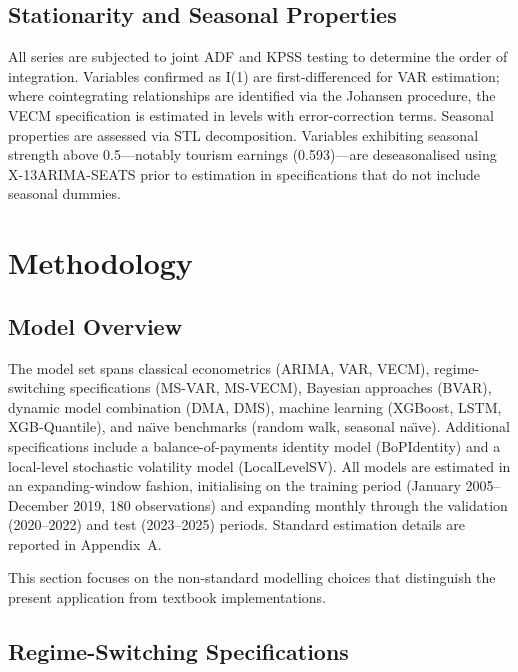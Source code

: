 \documentclass[12pt,a4paper]{article}
\begin{document}
\subsection{Stationarity and Seasonal Properties}

All series are subjected to joint ADF and KPSS testing to determine the order of integration. Variables confirmed as I(1) are first-differenced for VAR estimation; where cointegrating relationships are identified via the Johansen procedure, the VECM specification is estimated in levels with error-correction terms. Seasonal properties are assessed via STL decomposition. Variables exhibiting seasonal strength above 0.5---notably tourism earnings (0.593)---are deseasonalised using X-13ARIMA-SEATS prior to estimation in specifications that do not include seasonal dummies.

\section{Methodology}

\subsection{Model Overview}

The model set spans classical econometrics (ARIMA, VAR, VECM), regime-switching specifications (MS-VAR, MS-VECM), Bayesian approaches (BVAR), dynamic model combination (DMA, DMS), machine learning (XGBoost, LSTM, XGB-Quantile), and na\"{\i}ve benchmarks (random walk, seasonal na\"{\i}ve). Additional specifications include a balance-of-payments identity model (BoPIdentity) and a local-level stochastic volatility model (LocalLevelSV). All models are estimated in an expanding-window fashion, initialising on the training period (January 2005--December 2019, 180 observations) and expanding monthly through the validation (2020--2022) and test (2023--2025) periods. Standard estimation details are reported in Appendix~A.

This section focuses on the non-standard modelling choices that distinguish the present application from textbook implementations.

\subsection{Regime-Switching Specifications}
\end{document}

